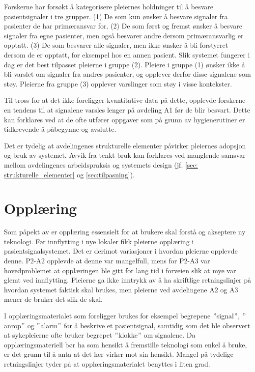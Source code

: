 \noindent
Forskerne har forsøkt å kategorisere pleiernes holdninger til å besvare pasientsignaler i tre grupper. (1) De som kun ønsker å besvare signaler fra pasienter de har primæransvar for. (2) De som  først og fremst ønsker å besvare signaler fra egne pasienter, men også besvarer andre dersom primæransvarlig er opptatt. (3) De som besvarer alle signaler, men ikke ønsker å bli forstyrret dersom de er opptatt, for eksempel hos en annen pasient. Slik systemet fungerer i dag er det best tilpasset pleierne i gruppe (2). Pleiere i gruppe (1) ønsker ikke å bli varslet om signaler fra andres pasienter, og opplever derfor disse signalene som støy. Pleierne fra gruppe (3) opplever varslinger som støy i visse kontekster.

\noindent
Til tross for at det ikke foreligger kvantitative data på dette, opplevde forskerne en tendens til at signalene varsles lenger på avdeling A1 før de blir besvart. Dette kan forklares ved at de ofte utfører oppgaver som på grunn av hygienerutiner er tidkrevende å påbegynne og avslutte. 

\noindent
Det er tydelig at avdelingenes strukturelle elementer påvirker pleiernes adopsjon og bruk av systemet. Avvik fra tenkt bruk kan forklares ved manglende samsvar mellom avdelingenes arbeidspraksis og systemets design (jf. \ref{sec: strukturelle_elementer} og \ref{sec:tilpasning}). 

\section{Opplæring}
Som påpekt av \citet{Venkatesh99} er opplæring essensielt for at brukere skal forstå og akseptere ny teknologi. Før innflytting i nye lokaler fikk pleierne opplæring i pasientsignalsystemet. Det er derimot variasjoner i hvordan pleierne opplevde denne. P2-A2 opplevde at denne var mangelfull, mens for P2-A3 var hovedproblemet at opplæringen ble gitt for lang tid i forveien slik at mye var glemt ved innflytting. Pleierne ga ikke inntrykk av å ha skriftlige retningslinjer på hvordan systemet faktisk skal brukes, men pleierne ved avdelingene A2 og A3 mener de bruker det slik de skal. 

\noindent
I opplæringsmaterialet som foreligger brukes for eksempel begrepene $"$signal$"$, $"$anrop$"$ og $"$alarm$"$ for å beskrive et pasientsignal, samtidig som det ble observert at sykepleierne ofte bruker begrepet $"$klokke$"$ om signalene. Da opplæringsmateriell bør ha som hensikt å fremstille teknologi som enkel å bruke, er det grunn til å anta at det her virker mot sin hensikt. Mangel på tydelige retningslinjer tyder på at opplæringsmaterialet benyttes i liten grad. 

